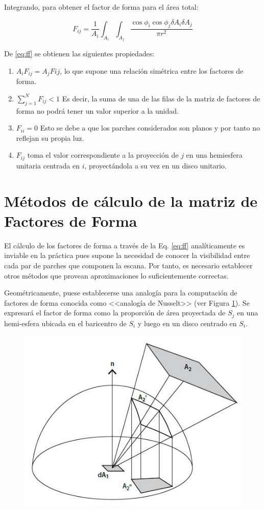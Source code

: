Integrando, para obtener el factor de forma para el área total:

\begin{equation}
    F_{ij} = \frac{1}{A_{i}} \int_{A_{i}}\int_{A_{j}}\frac{\cos{\phi_{i}}\cos{\phi_{j}}\delta{A_{i}}\delta{A_{j}}}{\pi{r^{2}}} \label{eq:ff}    
\end{equation}

De \eqref{eq:ff} se obtienen las siguientes propiedades:
\begin{enumerate}
	\label{propsff}
    \item $A_{i}F_{ij} = A_{j}F{ij}$, lo que supone una relación simétrica entre los factores de forma.
    \item $\sum_{j=1}^{N} F_{ij} < 1$ Es decir, la suma de una de las filas de la matriz de factores de forma no podrá tener un valor superior a la unidad.
    \item $F_{ii} = 0$ Esto se debe a que los parches considerados son planos y por tanto no reflejan su propia luz.
    \item $F_{ij}$ toma el valor correspondiente a la proyección de $j$ en una hemiesfera unitaria centrada en $i$, proyectándola a su vez en un disco unitario.
\end{enumerate}


\section{Métodos de cálculo de la matriz de Factores de Forma}
\label{sec:calculoff}

El cálculo de los factores de forma a través de la Eq. \eqref{eq:ff} analíticamente es inviable en la práctica pues supone la necesidad de conocer la visibilidad entre cada par de parches que componen la escana. Por tanto, es necesario establecer otros métodos que provean aproximaciones lo suficientemente correctas.

Geométricamente, puese establecerse una analogía para la computación de factores de forma conocida como <<analogía de Nusselt>> (ver Figura \ref{img:nusselt}). Se expresará el factor de forma como la proporción de área proyectada de $S_{j}$ en una hemi-esfera ubicada en el baricentro de $S_{i}$ y luego en un disco centrado en $S_{i}$.

\begin{figure}[H]
	\centering
	\includegraphics[width=0.55\linewidth]{assets/nusselt}
	\label{img:nusselt}
\end{figure}

